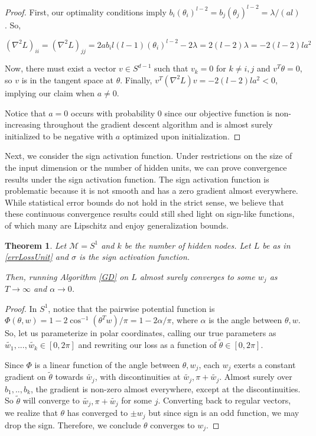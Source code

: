\documentclass[11pt]{article}
\newtheorem{theorem}{Theorem}[section]
\begin{document}
\begin{proof}
First, our optimality conditions imply $b_i(\theta_i)^{l-2} = b_j (\theta_j)^{l-2} = \lambda/(al)$. So,

\[(\nabla^2 L)_{ii} = (\nabla^2L)_{jj} = 2a b_i l(l-1)(\theta_i)^{l-2} - 2 \lambda = 2(l-2)\lambda = -2(l-2)la^2\]

Now, there must exist a vector $v \in S^{d-1}$ such that $v_k = 0$ for $k \neq i,j$ and $v^T\theta = 0$, so $v$ is in the tangent space at $\theta$. Finally, $v^T(\nabla^2 L) v  = -2(l-2)l a^2 < 0$, implying our claim when $a \neq 0$.

Notice that $a = 0$ occurs with probability 0 since our objective function is non-increasing throughout the gradient descent algorithm and is almost surely initialized to be negative with $a$ optimized upon initialization.
\end{proof}

Next, we consider the sign activation function. Under restrictions on the size of the input dimension or the number of hidden units, we can prove convergence results under the sign activation function. The sign activation function is problematic because it is not smooth and has a zero gradient almost everywhere. While statistical error bounds do not hold in the strict sense, we believe that these continuous convergence results could still shed light on sign-like functions, of which many are Lipschitz and enjoy generalization bounds. 

\begin{theorem}
\label{SignConv}
Let $\mathcal{M} = S^1$ and $k$ be the number of hidden nodes. Let $L$ be as in \eqref{errLossUnit} and $\sigma$ is the sign activation function.

Then, running Algorithm \ref{GD} on $L$ almost surely converges to some $w_j$ as $T\to\infty$ and $\alpha \to 0$.
\end{theorem}

\begin{proof}
In $S^1$, notice that the pairwise potential function is $\Phi(\theta,w) = 1 - 2\cos^{-1}(\theta^Tw)/\pi = 1 - 2\alpha/\pi$, where $\alpha$ is the angle between $\theta, w$. So, let us parameterize in polar coordinates, calling our true parameters as $\widetilde{w_1},...,\widetilde{w_k} \in [0,2\pi]$ and rewriting our loss as a function of $\widetilde{\theta} \in [0,2\pi]$. 

Since $\Phi$ is a linear function of the angle between $\theta, w_j$, each $w_j$ exerts a constant gradient on $\widetilde{\theta}$ towards $\widetilde{w_j}$, with discontinuities at $\widetilde{w_j},\pi+\widetilde{w_j}$. Almost surely over $b_1,..,b_k$, the gradient is non-zero almost everywhere, except at the discontinuities. So $\widetilde{\theta}$ will converge to $\widetilde{w_j}, \pi+\widetilde{w_j}$ for some $j$. Converting back to regular vectors, we realize that $\theta$ has converged to $\pm w_j$ but since sign is an odd function, we may drop the sign. Therefore, we conclude $\theta$ converges to $w_j$. 
\end{proof}
\end{document}
